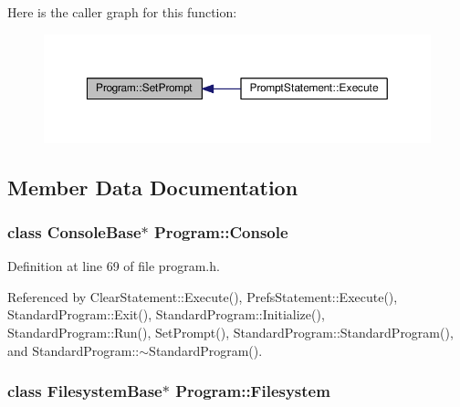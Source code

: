 Here is the caller graph for this function\+:\nopagebreak
\begin{figure}[H]
\begin{center}
\leavevmode
\includegraphics[width=350pt]{classProgram_a517c5f08c0c0dd7f79de6fbf0e62aac6_icgraph}
\end{center}
\end{figure}




\subsection{Member Data Documentation}
\subsubsection[{\texorpdfstring{Console}{Console}}]{\setlength{\rightskip}{0pt plus 5cm}class {\bf Console\+Base}$\ast$ Program\+::\+Console}\hypertarget{classProgram_a7edba60e839230f20ce29716567bc892}{}\label{classProgram_a7edba60e839230f20ce29716567bc892}


Definition at line 69 of file program.\+h.



Referenced by Clear\+Statement\+::\+Execute(), Prefs\+Statement\+::\+Execute(), Standard\+Program\+::\+Exit(), Standard\+Program\+::\+Initialize(), Standard\+Program\+::\+Run(), Set\+Prompt(), Standard\+Program\+::\+Standard\+Program(), and Standard\+Program\+::$\sim$\+Standard\+Program().

\subsubsection[{\texorpdfstring{Filesystem}{Filesystem}}]{\setlength{\rightskip}{0pt plus 5cm}class {\bf Filesystem\+Base}$\ast$ Program\+::\+Filesystem}\hypertarget{classProgram_a54fb0dc3ee40a356fe91cea64e569b26}{}\label{classProgram_a54fb0dc3ee40a356fe91cea64e569b26}


